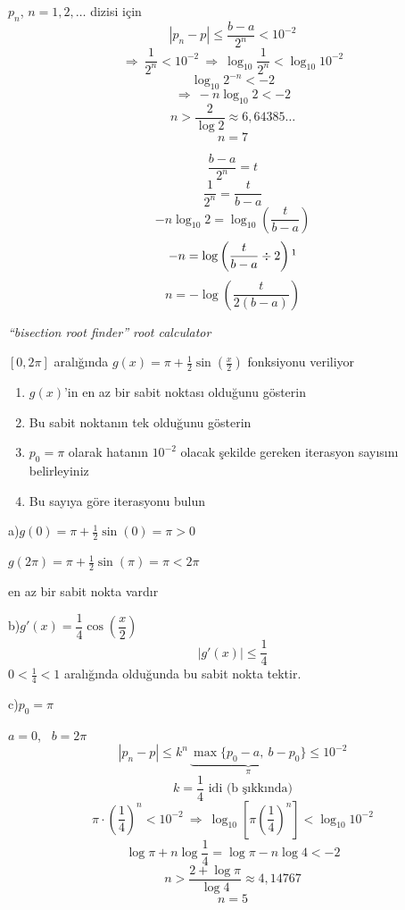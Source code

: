 \documentclass[11pt,a4paper]{article}
\begin{document}
\noindent\begin{minipage}[t]{0.62\linewidth}
$p_n$, $n=1,2,\dots$ dizisi için
\[ |p_n-p|\le\frac{b-a}{2^n}<10^{-2} \]
\[
  \Rightarrow\ \frac{1}{2^n}<10^{-2} \ \Rightarrow\ \log_{10}\frac{1}{2^n}<\log_{10}10^{-2}
\]
\[ \log_{10}2^{-n}<-2 \]
\[ \Rightarrow\ -n\log_{10}2<-2 \]
\[ n>\frac{2}{\log2}\approx 6{,}64385\ldots \]
\[ n=7 \]
\end{minipage}\hfill
\begin{minipage}[t]{0.34\linewidth}
\small
\[ \frac{b-a}{2^n}=t \]
\[ \frac{1}{2^n}=\frac{t}{b-a} \]
\[ -n\log_{10}2=\log_{10}\left(\frac{t}{b-a}\right) \]
\[ -n=\log\left(\frac{t}{b-a}\div 2\right)\footnotemark \]
\[ n=-\log\left(\frac{t}{2(b-a)}\right) \]
\end{minipage}

{\small\textit{``bisection root finder'' \quad root calculator}}

\begin{ornek}[2. soru]
$[0,2\pi]$ aralığında $g(x)=\pi+\frac12\sin\!\left(\frac{x}{2}\right)$ fonksiyonu veriliyor
\begin{enumerate}[label=\alph*)]
  \item $g(x)$'in en az bir sabit noktası olduğunu gösterin
  \item Bu sabit noktanın tek olduğunu gösterin
  \item $p_0=\pi$ olarak hatanın $10^{-2}$ olacak şekilde gereken iterasyon sayısını belirleyiniz
  \item Bu sayıya göre iterasyonu bulun
\end{enumerate}
\end{ornek}

a)\quad $g(0)=\pi+\frac12\sin(0)=\pi>0$

\hspace*{2.2em}$g(2\pi)=\pi+\frac12\sin(\pi)=\pi<2\pi$

\hspace*{2.2em}en az bir sabit nokta vardır

\medskip
b)\quad $g'(x)=\dfrac14\cos\!\left(\dfrac{x}{2}\right)$
\[ |g'(x)|\le\frac14 \]
$0<\frac14<1$ aralığında olduğunda bu sabit nokta tektir.

\medskip
c)\quad $p_0=\pi$

\hspace*{2.2em}$a=0$, \ $b=2\pi$
\[
  |p_n-p|\le k^n\,\underbrace{\max\{p_0-a,\ b-p_0\}}_{\pi}\le10^{-2}
\]
\[ k=\frac14 \text{ idi (b şıkkında)} \]
\[
  \pi\cdot\left(\frac14\right)^n<10^{-2} \ \Rightarrow\ \log_{10}\left[\pi\left(\frac14\right)^n\right]<\log_{10}10^{-2}
\]
\[ \log\pi+n\log\frac14=\log\pi-n\log4<-2 \]
\[ n>\frac{2+\log\pi}{\log4}\approx 4{,}14767 \]
\[ n=5 \]
\end{document}
